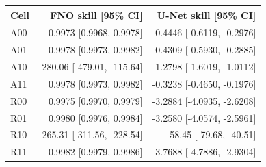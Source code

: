 \begin{tabular}{lrr}
\toprule
Cell & FNO skill [95\% CI] & U-Net skill [95\% CI] \\
\midrule
A00 & 0.9973 [0.9968, 0.9978] & -0.4446 [-0.6119, -0.2976] \\
A01 & 0.9978 [0.9973, 0.9982] & -0.4309 [-0.5930, -0.2885] \\
A10 & -280.06 [-479.01, -115.64] & -1.2798 [-1.6019, -1.0112] \\
A11 & 0.9978 [0.9973, 0.9982] & -0.3238 [-0.4650, -0.1976] \\
R00 & 0.9975 [0.9970, 0.9979] & -3.2884 [-4.0935, -2.6208] \\
R01 & 0.9980 [0.9976, 0.9984] & -3.2580 [-4.0574, -2.5961] \\
R10 & -265.31 [-311.56, -228.54] & -58.45 [-79.68, -40.51] \\
R11 & 0.9982 [0.9979, 0.9986] & -3.7688 [-4.7886, -2.9304] \\
\bottomrule
\end{tabular}
